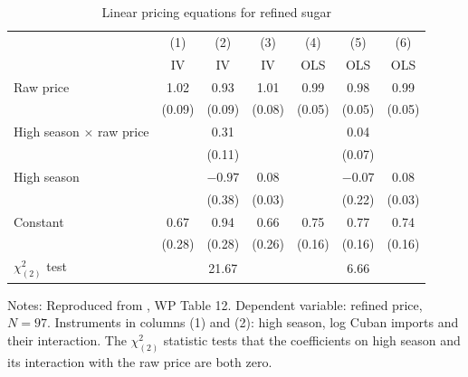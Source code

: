 \begin{table}[htbp]
\centering
\caption{Linear pricing equations for refined sugar}\label{tab:03-gm-reduced}
\small
\begin{tabular}{@{}lcccccc@{}}
\toprule
 & (1) & (2) & (3) & (4) & (5) & (6)\\
 & IV & IV & IV & OLS & OLS & OLS\\
\midrule
Raw price & 1.02 & 0.93 & 1.01 & 0.99 & 0.98 & 0.99\\
 & (0.09) & (0.09) & (0.08) & (0.05) & (0.05) & (0.05)\\
High season $\times$ raw price & & 0.31 & & & 0.04 & \\
 & & (0.11) & & & (0.07) & \\
High season & & $-0.97$ & 0.08 & & $-0.07$ & 0.08\\
 & & (0.38) & (0.03) & & (0.22) & (0.03)\\
Constant & 0.67 & 0.94 & 0.66 & 0.75 & 0.77 & 0.74\\
 & (0.28) & (0.28) & (0.26) & (0.16) & (0.16) & (0.16)\\
$\chi^2_{(2)}$ test & & 21.67 & & & 6.66 & \\
\bottomrule
\end{tabular}

\smallskip
\begin{minipage}{0.92\textwidth}\footnotesize
Notes: Reproduced from \citet{GenesoveMullin1995}, WP Table 12. Dependent variable: refined price, $N = 97$.
Instruments in columns (1) and (2): high season, log Cuban imports and their interaction. The $\chi^2_{(2)}$
statistic tests that the coefficients on high season and its interaction with the raw price are both zero.
\end{minipage}
\end{table}

